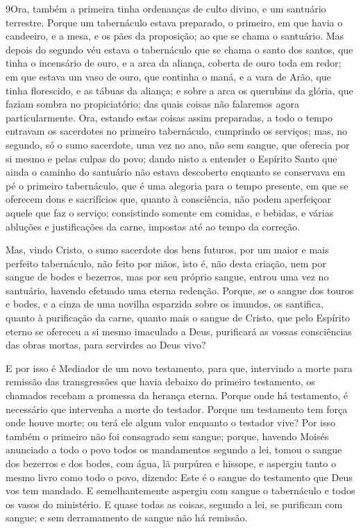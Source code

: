 \medskip

\lettrine{9} Ora, também a primeira tinha ordenanças de culto
divino, e um santuário terrestre. Porque um tabernáculo estava
preparado, o primeiro, em que havia o candeeiro, e a mesa, e os pães
da proposição; ao que se chama o santuário. Mas depois do
segundo véu estava o tabernáculo que se chama o santo dos santos,
que tinha o incensário de ouro, e a arca da aliança, coberta de
ouro toda em redor; em que estava um vaso de ouro, que continha o
maná, e a vara de Arão, que tinha florescido, e as tábuas da
aliança; e sobre a arca os querubins da glória, que faziam
sombra no propiciatório; das quais coisas não falaremos agora
particularmente. Ora, estando estas coisas assim preparadas, a
todo o tempo entravam os sacerdotes no primeiro tabernáculo,
cumprindo os serviços; mas, no segundo, só o sumo sacerdote, uma
vez no ano, não sem sangue, que oferecia por si mesmo e pelas culpas
do povo; dando nisto a entender o Espírito Santo que ainda o
caminho do santuário não estava descoberto enquanto se conservava em
pé o primeiro tabernáculo, que é uma alegoria para o tempo
presente, em que se oferecem dons e sacrifícios que, quanto à
consciência, não podem aperfeiçoar aquele que faz o serviço;
consistindo somente em comidas, e bebidas, e várias abluções
e justificações da carne, impostas até ao tempo da correção.

Mas, vindo Cristo, o sumo sacerdote dos bens futuros, por um
maior e mais perfeito tabernáculo, não feito por mãos, isto é, não
desta criação, nem por sangue de bodes e bezerros, mas por
seu próprio sangue, entrou uma vez no santuário, havendo efetuado
uma eterna redenção. Porque, se o sangue dos touros e bodes,
e a cinza de uma novilha esparzida sobre os imundos, os santifica,
quanto à purificação da carne, quanto mais o sangue de
Cristo, que pelo Espírito eterno se ofereceu a si mesmo imaculado a
Deus, purificará as vossas consciências das obras mortas, para
servirdes ao Deus vivo?

E por isso é Mediador de um novo testamento, para que, intervindo
a morte para remissão das transgressões que havia debaixo do
primeiro testamento, os chamados recebam a promessa da herança
eterna. Porque onde há testamento, é necessário que
intervenha a morte do testador. Porque um testamento tem
força onde houve morte; ou terá ele algum valor enquanto o testador
vive? Por isso também o primeiro não foi consagrado sem
sangue; porque, havendo Moisés anunciado a todo o povo todos
os mandamentos segundo a lei, tomou o sangue dos bezerros e dos
bodes, com água, lã purpúrea e hissope, e aspergiu tanto o mesmo
livro como todo o povo, dizendo: Este é o sangue do
testamento que Deus vos tem mandado. E semelhantemente
aspergiu com sangue o tabernáculo e todos os vasos do ministério.
E quase todas as coisas, segundo a lei, se purificam com
sangue; e sem derramamento de sangue não há remissão.

